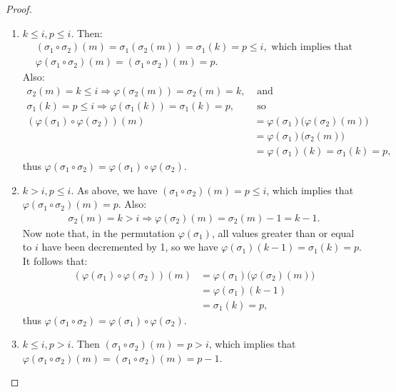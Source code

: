 \documentclass{article}
\begin{document}
\begin{proof}
    \begin{enumerate}[itemsep=0em]
        \item $k \leq i, p \leq i$. Then:
              \begin{multline*}
                (\sigma_1 \circ \sigma_2)(m) = \sigma_1(\sigma_2(m)) = \sigma_1(k) = p \leq i, \text{ which implies that} \\
                \varphi(\sigma_1 \circ \sigma_2)(m) = (\sigma_1 \circ \sigma_2)(m) = p.
              \end{multline*}
              Also:
              \begin{align*}
                \sigma_2(m) = k \leq i \Rightarrow \varphi(\sigma_2(m)) = \sigma_2(m) = k, & \text{ and} \\
                \sigma_1(k) = p \leq i \Rightarrow \varphi(\sigma_1(k)) = \sigma_1(k) = p, & \text{ so} \\
                (\varphi(\sigma_1) \circ \varphi(\sigma_2))(m) &= \varphi(\sigma_1)\bigl(\varphi(\sigma_2)(m)\bigr) \\ &= \varphi(\sigma_1)\bigl(\sigma_2(m)\bigr) \\ &= \varphi(\sigma_1)(k) = \sigma_1(k) = p,
              \end{align*}
              thus $\varphi(\sigma_1 \circ \sigma_2) = \varphi(\sigma_1) \circ \varphi(\sigma_2)$.
        \item $k > i, p \leq i$. As above, we have $(\sigma_1 \circ \sigma_2)(m) = p \leq i$, which implies that $\varphi(\sigma_1 \circ \sigma_2)(m) = p$. Also:
              \begin{align*}
                \sigma_2(m) = k > i \Rightarrow \varphi(\sigma_2)(m) = \sigma_2(m) - 1 = k - 1.
              \end{align*}
              Now note that, in the permutation $\varphi(\sigma_1)$, all values greater than or equal to $i$ have been decremented by 1, so we have $\varphi(\sigma_1)(k - 1) = \sigma_1(k) = p$. It follows that:
              \begin{align*}
                (\varphi(\sigma_1) \circ \varphi(\sigma_2))(m) &= \varphi(\sigma_1)\bigl(\varphi(\sigma_2)(m)\bigr) \\ &= \varphi(\sigma_1)(k - 1) \\ &= \sigma_1(k) = p,
              \end{align*}
              thus $\varphi(\sigma_1 \circ \sigma_2) = \varphi(\sigma_1) \circ \varphi(\sigma_2)$.
        \item $k \leq i, p > i$. Then $(\sigma_1 \circ \sigma_2)(m) = p > i$, which implies that $\varphi(\sigma_1 \circ \sigma_2)(m) = (\sigma_1 \circ \sigma_2)(m) = p - 1$.

\end{enumerate}
\end{proof}
\end{document}
